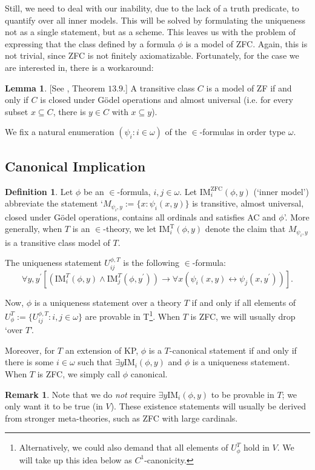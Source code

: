 \documentclass[a4paper,12pt]{amsart}
\theoremstyle{definition}
\newtheorem{lemma}[fact]{Lemma}
\newtheorem{defini}[fact]{Definition}
\newtheorem{remark}[fact]{Remark}
\begin{document}
Still, we need to deal with our inability, due to the lack of a truth predicate, to quantify over all inner models. This will be solved by formulating the uniqueness not as a single statement,
but as a scheme. This leaves us with the problem of expressing that the class defined by a formula $\phi$ is a model of ZFC. Again, this is not trivial, since ZFC is not finitely axiomatizable.
Fortunately, for the case we are interested in, there is a workaround:

\begin{lemma}{\label{ZFmodelchar}}
[See \cite{Je}, Theorem $13.9$.]
 A transitive class $C$ is a model of ZF if and only if $C$ is closed under G\"odel operations and almost universal (i.e. for every subset $x\subseteq C$, there is $y\in C$ with $x\subseteq y$).
\end{lemma}


We fix a natural enumeration $(\psi_{i}:i\in\omega)$ of the $\in$-formulas in order type $\omega$.

\subsection{Canonical Implication}

\begin{defini}
Let $\phi$ be an $\in$-formula, $i,j\in\omega$.
Let $\text{IM}_{i}^{\text{ZFC}}(\phi
,y)$ (`inner model') abbreviate the statement `$M_{\psi_{i},y}:=\{x:\psi_{i}(x,y)\}$ is transitive, almost universal, closed under G\"odel operations,
contains all ordinals and satisfies AC and $\phi$'. More generally, when $T$ is an $\in$-theory, we let $\text{IM}_{i}^{\text{T}}(\phi
,y)$ denote the claim that $M_{\psi_{i},y}$ is a transitive class model of $T$.

The uniqueness statement $U_{ij}^{\phi%
,T}$ is the following $\in$-formula: $$\forall{y,y^{\prime}}[(\text{IM}_{i}^{T}(\phi%
,y) \wedge \text{IM}_{j}^{T}(\phi%
,y^{\prime}))\rightarrow \forall{x}(\psi_{i}(x,y)\leftrightarrow\psi_{j}(x,y^{\prime}))].$$

Now, $\phi$ %
 is a uniqueness statement over a theory $T$ if and only if all elements of $U_{\phi}^{T}:=\{U_{ij}^{\phi%
,T}:i,j\in\omega\}$ are provable in 
T\footnote{Alternatively, we could also demand that all elements of $U_{\phi}^{T}$ hold in $V$. We will take up this idea below as $C^{1}$-canonicity.}. When $T$ is ZFC, we will usually drop `over $T$'.


Moreover, for $T$ an extension of KP, $\phi$ %
is a $T$-canonical statement if and only if there is some $i\in\omega$ such that $\exists{y}\text{IM}_{i}(\phi,y)$ and $\phi$%
 is a uniqueness statement. When $T$ is ZFC, we simply call $\phi$ %
canonical.

\begin{remark}
Note that we do \textit{not} require $\exists{y}\text{IM}_{i}(\phi,y)$ to be provable in $T$; we only want it to be true (in $V$). These existence statements will usually be derived from stronger meta-theories, such as ZFC with large cardinals.
\end{remark}


\end{defini}
\end{document}
